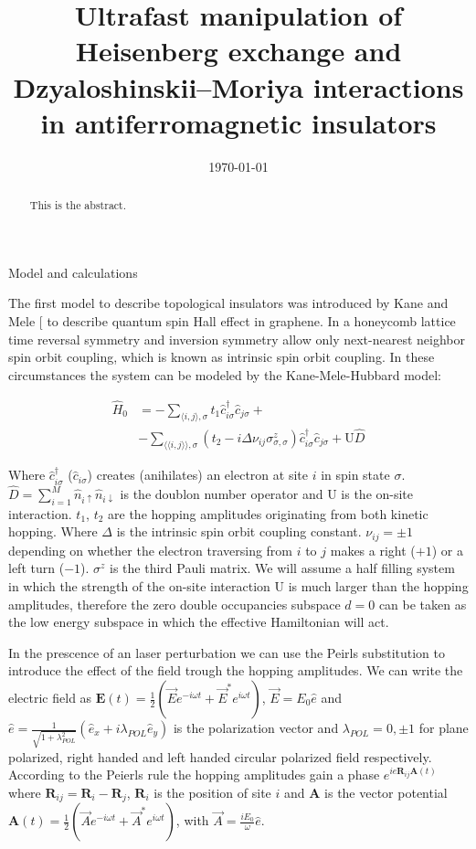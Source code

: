 \documentclass[aps,prl,twocolumn,amsmath,amssymb,superscriptaddress,nobibnotes]{revtex4}%
\renewcommand{\cite}[1]{{[}\onlinecite{#1}{]}}
\newcommand{\n}{\nonumber}
\newcommand{\bs}{\boldsymbol}
\begin{document}
\title{Ultrafast manipulation of Heisenberg exchange and Dzyaloshinskii–Moriya interactions in antiferromagnetic insulators}


\begin{abstract}
This is the abstract.
\end{abstract}

\date{\today}
\maketitle

\begin{section}{Model and calculations}

The first model to describe topological insulators was introduced by Kane and Mele \cite{Kane2005} to describe quantum spin Hall effect in graphene. In a honeycomb lattice time reversal symmetry and inversion symmetry allow only next-nearest neighbor spin orbit coupling, which is known as intrinsic spin orbit coupling. In these circumstances the system can be modeled by the Kane-Mele-Hubbard model:

\begin{align}
\label{MKMH}
\hat{H}_0 &= - \sum_{\langle i,j \rangle, \sigma} t_1\hat{c}_{i \sigma}^\dagger \hat{c}_{j \sigma} + \n \\
	&-\sum_{\langle \langle i,j \rangle \rangle, \sigma}(t_2 - i\Delta\nu_{ij}\sigma^z_{\sigma, \sigma})\hat{c}_{i \sigma}^\dagger \hat{c}_{j \sigma} + 
	\text{U}\hat{D}
\end{align}

Where $\hat{c}_{i \sigma}^\dagger$ ($ \hat{c}_{i \sigma}$) creates (anihilates) an electron at site $i$ in spin state $\sigma$. $\hat{D} = \sum_{i=1}^M \hat{n}_{i\uparrow}\hat{n}_{i\downarrow}$ is the doublon number operator and $\text{U}$ is the on-site interaction. $t_1$, $t_2$ are the hopping amplitudes originating from both kinetic hopping. Where $\Delta$ is the intrinsic spin orbit coupling constant. $\nu_{ij}=\pm 1$ depending on whether the electron traversing from $i$ to $j$ makes a right ($+1$) or a left turn ($-1$). $\sigma^{z}$ is the third Pauli matrix. We will assume a half filling system in which the strength of the on-site interaction $\text{U}$ is much larger than the hopping amplitudes, therefore the zero double occupancies subspace $d=0$ can be taken as the low energy subspace in which the effective Hamiltonian will act.

In the prescence of an laser perturbation we can use the Peirls substitution to introduce the effect of the field trough the hopping amplitudes. We can write the electric field as $\bs{E}(t) = \frac{1}{2}(\vec{E}e^{-i\omega t}+\vec{E}^*e^{i\omega t})$, $\vec{E} = E_0\hat{e}$ and $\hat{e} = \frac{1}{\sqrt{1+\lambda_{POL}^2}}(\hat{e}_x+i\lambda_{POL}\hat{e}_y)$ is the polarization vector and $\lambda_{POL} = 0, \pm 1$ for plane polarized, right handed and left handed circular polarized field respectively. According to the Peierls rule the hopping amplitudes gain a phase $e^{ie\bs{R}_{ij}\bs{A}(t)}$ where $\bs{R}_{ij} = \bs{R}_i-\bs{R}_j$, $\bs{R}_i$ is the position of site $i$ and $\bs{A}$ is the vector potential $\bs{A}(t) = \frac{1}{2}(\vec{A}e^{-i\omega t} + \vec{A}^* e^{i\omega t})$, with $\vec{A} = \frac{iE_0}{\omega}\hat{e}$.


\end{section}
\end{document}
